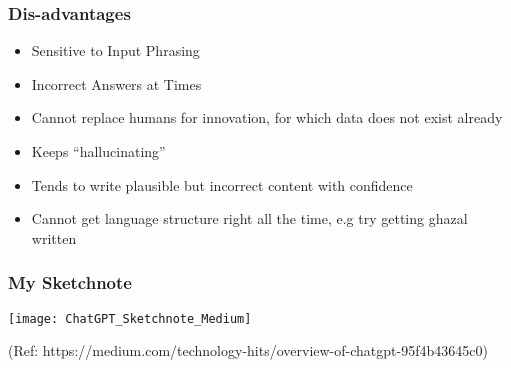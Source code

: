 \begin{frame}[fragile]\frametitle{Dis-advantages}


\begin{itemize}
\item Sensitive to Input Phrasing
\item Incorrect Answers at Times
\item Cannot replace humans for innovation, for which data does not exist already
\item Keeps ``hallucinating''
\item Tends to write plausible but incorrect content with confidence
\item Cannot get language structure right all the time, e.g try getting ghazal written
\end{itemize}	 

\end{frame}



\begin{frame}[fragile]\frametitle{My Sketchnote}

\begin{center}
\texttt{[image: ChatGPT\_Sketchnote\_Medium]}
\end{center}		

{\tiny (Ref: https://medium.com/technology-hits/overview-of-chatgpt-95f4b43645c0)}
			

\end{frame}






